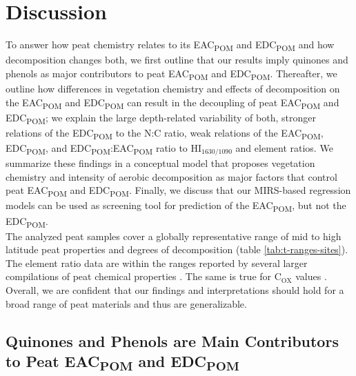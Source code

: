 \documentclass[alpha-refs, lineno]{wiley-article-rmd}
\begin{document}
\hypertarget{discussion}{%
\section{Discussion}\label{discussion}}

To answer how peat chemistry relates to its EAC\textsubscript{POM} and EDC\textsubscript{POM} and how decomposition changes both, we first outline that our results imply quinones and phenols as major contributors to peat EAC\textsubscript{POM} and EDC\textsubscript{POM}. Thereafter, we outline how differences in vegetation chemistry and effects of decomposition on the EAC\textsubscript{POM} and EDC\textsubscript{POM} can result in the decoupling of peat EAC\textsubscript{POM} and EDC\textsubscript{POM}; we explain the large depth-related variability of both, stronger relations of the EDC\textsubscript{POM} to the N:C ratio, weak relations of the EAC\textsubscript{POM}, EDC\textsubscript{POM}, and EDC\textsubscript{POM}:EAC\textsubscript{POM} ratio to HI\(_\text{1630/1090}\) and element ratios. We summarize these findings in a conceptual model that proposes vegetation chemistry and intensity of aerobic decomposition as major factors that control peat EAC\textsubscript{POM} and EDC\textsubscript{POM}.
Finally, we discuss that our MIRS-based regression models can be used as screening tool for prediction of the EAC\textsubscript{POM}, but not the EDC\textsubscript{POM}.\\
The analyzed peat samples cover a globally representative range of mid to high latitude peat properties and degrees of decomposition (table \ref{tab:t-ranges-sites}).
The element ratio data are within the ranges reported by several larger compilations of peat chemical properties \autocite{Moore.2018,Leifeld.2020,Wang.2015b,Loisel.2014,Tipping.2016}. The same is true for C\(_\textrm{OX}\) values \autocite{Worrall.2016b,Moore.2018,Leifeld.2020}. Overall, we are confident that our findings and interpretations should hold for a broad range of peat materials and thus are generalizable.

\hypertarget{quinones-and-phenols-are-main-contributors-to-peat-eac-and-edc}{%
\subsection{\texorpdfstring{Quinones and Phenols are Main Contributors to Peat EAC\textsubscript{POM} and EDC\textsubscript{POM}}{Quinones and Phenols are Main Contributors to Peat EAC and EDC}}\label{quinones-and-phenols-are-main-contributors-to-peat-eac-and-edc}}
\end{document}
